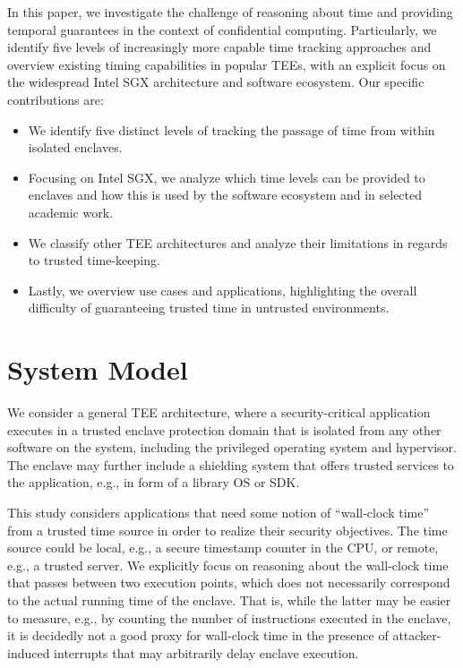 In this paper, we investigate the challenge of reasoning about time and
providing temporal guarantees in the context of confidential computing.
Particularly, we identify five levels of increasingly more capable time tracking
approaches and overview existing timing capabilities in popular TEEs, with an
explicit focus on the widespread Intel SGX architecture and software ecosystem.
Our specific contributions are:
\begin{itemize}
	\item We identify five distinct levels of tracking the passage of time from
	within isolated enclaves.
	\item Focusing on Intel SGX, we analyze which time levels can be provided
	to enclaves and how this is used by the software ecosystem and in selected
	academic work.
 	\item We classify other TEE architectures and analyze their limitations in
 	regards to trusted time-keeping.
 	\item Lastly, we overview use cases and applications, highlighting the
 	overall difficulty of guaranteeing trusted time in untrusted environments.
\end{itemize}

\section{System Model}

We consider a general \ac{TEE} architecture, where a security-critical
application executes in a trusted enclave protection domain that is isolated
from any other software on the system, including the privileged operating system
and hypervisor. The enclave may further include a shielding system that offers
trusted services to the application, e.g., in form of a library OS or \ac{SDK}.

This study considers applications that need some notion of ``wall-clock time''
from a trusted time source in order to realize their security objectives. The
time source could be local, e.g., a secure timestamp counter in the CPU, or
remote, e.g., a trusted server. We explicitly focus on reasoning about the
wall-clock time that passes between two execution points, which does not
necessarily correspond to the actual running time of the enclave. That is, while
the latter may be easier to measure, e.g., by counting the number of
instructions executed in the enclave, it is decidedly {not} a good proxy for
wall-clock time in the presence of attacker-induced interrupts that may
arbitrarily delay enclave execution.

